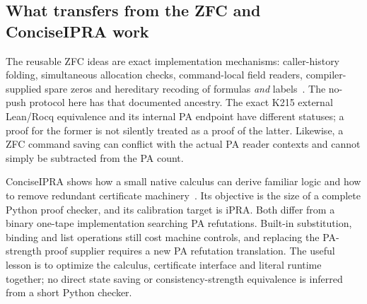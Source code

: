 \subsection{What transfers from the ZFC and ConciseIPRA work}

The reusable ZFC ideas are exact implementation mechanisms: caller-history
folding, simultaneous allocation checks, command-local field readers,
compiler-supplied spare zeros and hereditary recoding of formulas
\emph{and} labels~\cite{zfc}. The no-push protocol here has that documented
ancestry. The exact K215 external Lean/Rocq equivalence and its internal PA
endpoint have different statuses; a proof for the former is not silently
treated as a proof of the latter. Likewise, a ZFC command saving can conflict
with the actual PA reader contexts and cannot simply be subtracted from
the PA count.

ConciseIPRA shows how a small native calculus can derive familiar logic and
how to remove redundant certificate machinery~\cite{ipra}. Its objective
is the size of a complete Python proof checker, and its calibration target
is iPRA. Both differ from a binary one-tape implementation searching PA
refutations. Built-in substitution, binding and list operations still cost
machine controls, and replacing the PA-strength proof supplier requires a
new PA refutation translation. The useful lesson is to optimize the
calculus, certificate interface and literal runtime together; no direct
state saving or consistency-strength equivalence is inferred from a short
Python checker.
